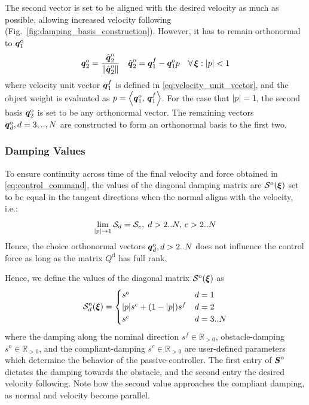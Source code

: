 The second vector is set to be aligned with the desired velocity as much as possible, allowing increased velocity following (Fig.~\ref{fig:damping_basis_construction}). However, it has to remain orthonormal to $\boldsymbol{q}_1^{\mathrm{o}}$
\begin{equation}
  \boldsymbol{q}_2^{\mathrm{o}} = \frac{\hat{\boldsymbol{q}}_2^{\mathrm{o}}}{\| \hat{\boldsymbol{q}}_2^{\mathrm{o}} \|}
  \quad
  \hat{\boldsymbol{q}}_2^{\mathrm{o}} = \boldsymbol{q}_1^{f} - \boldsymbol{q}_1^{\mathrm{o}} p \quad  \forall \, \boldsymbol{\xi} : | p | < 1
\end{equation}
where velocity unit vector $\boldsymbol{q}_1^{f}$ is defined in \eqref{eq:velocity_unit_vector}, and the object weight is evaluated as $p = \left\langle {\boldsymbol{q}_1^{\mathrm{o}}}, \, {\boldsymbol{q}_1^{f}} \right\rangle$. 
For the case that $| p | = 1$, the second basis $\boldsymbol{q}_2^{\mathrm{o}}$ is set to be any orthonormal vector. The remaining vectors $\boldsymbol{q}_d^{\mathrm{o}}, d = 3, .., N$ are constructed to form an orthonormal basis to the first two.

\subsubsection{Damping Values}
To ensure continuity across time of the final velocity and force obtained in \eqref{eq:control_command}, the values of the diagonal damping matrix are $\mathcal{S}^{\mathrm{o}}(\boldsymbol{\xi})$ set to be equal in the tangent directions when the normal aligns with the velocity, i.e.:
\begin{equation}
    \lim_{| p | \rightarrow 1} \mathcal{S}_d = \mathcal{S}_e, \; d > 2 .. N, \, e > 2 .. N
\end{equation}
Hence, the choice orthonormal vectors $\boldsymbol{q}_d^{\mathrm{o}}, d > 2 .. N$ does not influence the control force as long as the matrix $Q^{\mathrm{d}}$ has full rank.

Hence, we define the values of the diagonal matrix $\mathcal{S}^{\mathrm{o}}(\boldsymbol{\xi})$ as
\begin{equation}
  \matd{S}_d^{\mathrm{o}}(\vecs \xi) =
  \begin{cases}
    s^{\mathrm{o}} & d = 1 \\
    | p | s^c + (1 - | p |) s^{f} & d = 2 \\
    s^c & d = 3 .. N
  \end{cases}
  \label{eq:obstacle_damping_values}
\end{equation}
where the damping along the nominal direction $s^{f} \in \mathbb{R}_{>0}$, obstacle-damping $s^{\mathrm{o}} \in \mathbb{R}_{>0}$, and the compliant-damping $s^c \in \mathbb{R}_{>0}$ are user-defined parameters which determine the behavior of the passive-controller. The first entry of $\boldsymbol{S}^{\mathrm{o}}$ dictates the damping towards the obstacle, and the second entry the desired velocity following. Note how the second value approaches the compliant damping, as normal and velocity become parallel.

